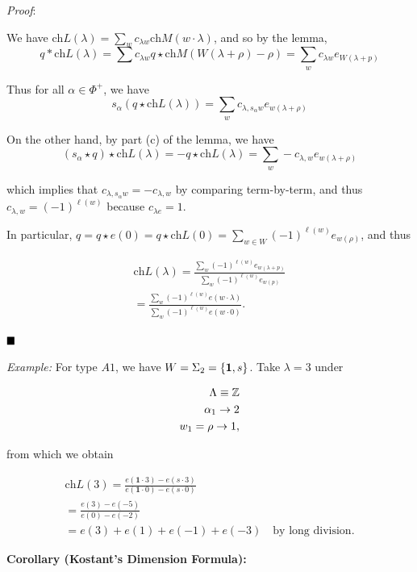 \emph{Proof}:

We have
\(\mathrm{ch} L(\lambda) = \sum_{w} c_{\lambda w} \mathrm{ch} M(w\cdot \lambda)\),
and so by the lemma, \[
q \ast \mathrm{ch} L(\lambda) = \sum c_{\lambda w} q \star \mathrm{ch} M(W(\lambda + \rho) - \rho) = \sum_w c_{\lambda w} e_{W(\lambda + p)}
\]

Thus for all \(\alpha \in \Phi^+\), we have \[
s_\alpha(q \star \mathrm{ch} L(\lambda)) = \sum_w c_{\lambda, s_\alpha w} e_{w(\lambda + \rho)}
\]

On the other hand, by part (c) of the lemma, we have \[
(s_\alpha \star q) \star \mathrm{ch} L(\lambda) 
= -q \star \mathrm{ch} L(\lambda) 
= \sum_w -c_{\lambda, w} e_{w(\lambda+\rho)}
\]

which implies that \(c_{\lambda, s_\alpha w} = -c_{\lambda, w}\) by
comparing term-by-term, and thus \(c_{\lambda, w} = (-1)^{\ell(w)}\)
because \(c_{\lambda e} = 1\).

In particular,
\(q = q \star e(0) = q \star \mathrm{ch} L(0) = \sum_{w\in W} (-1)^{\ell(w)} e_{w(\rho)}\),
and thus

\begin{align*}
\mathrm{ch} L(\lambda) = 
\frac {
\sum_w (-1)^{\ell(w)} e_{w(\lambda+p)}
}{
\sum_w (-1)^{\ell(w)} e_{w(p)}
} \\
=
\frac {
\sum_w (-1)^{\ell(w)} e(w\cdot \lambda) 
}{
\sum_w (-1)^{\ell(w)} e(w \cdot 0)
}.
\end{align*}

\(\qed\)

\emph{Example:} For type \(A1\), we have
\(W = \Sigma_2 = \left\{{\mathbf{1}, s}\right\}\). Take \(\lambda = 3\) under

\begin{align*}
\Lambda \equiv {\mathbb{Z}} \\
\alpha_1 \to 2 \\
w_1 = \rho \to 1
,\end{align*}

from which we obtain

\begin{align*}
\mathrm{ch} L(3) = 
\frac {
e(\mathbf{1} \cdot 3) - e(s\cdot 3)
}{
e(\mathbf{1} \cdot 0) - e(s\cdot 0)
} \\
=
\frac{e(3) - e(-5)}{e(0) - e(-2)} \\
= e(3) + e(1) + e(-1) + e(-3) \quad\text{by long division}
.\end{align*}

\textbf{Corollary (Kostant's Dimension Formula):}

